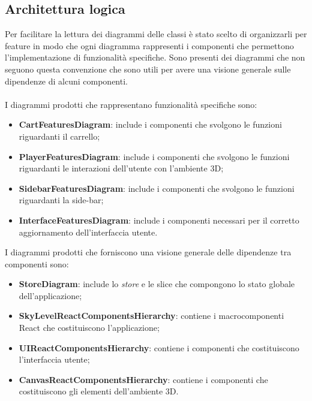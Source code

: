\subsection{Architettura logica}
Per facilitare la lettura dei diagrammi delle classi è stato scelto di organizzarli per feature in modo che ogni diagramma 
rappresenti i componenti che permettono l'implementazione di funzionalità specifiche.
Sono presenti dei diagrammi che non seguono questa convenzione che sono utili per avere una visione generale sulle dipendenze
di alcuni componenti.
\\\\
I diagrammi prodotti che rappresentano funzionalità specifiche sono:
\begin{itemize}
	\item \textbf{CartFeaturesDiagram}: include i componenti che svolgono le funzioni riguardanti il carrello;
	\item \textbf{PlayerFeaturesDiagram}: include i componenti che svolgono le funzioni riguardanti le interazioni dell'utente con 
	l'ambiente 3D;
	\item \textbf{SidebarFeaturesDiagram}: include i componenti che svolgono le funzioni riguardanti la side-bar;
	\item \textbf{InterfaceFeaturesDiagram}: include i componenti necessari per il corretto aggiornamento dell'interfaccia utente.
\end{itemize}
I diagrammi prodotti che forniscono una visione generale delle dipendenze tra componenti sono:
\begin{itemize}
	\item \textbf{StoreDiagram}: include lo \textit{store} e le slice che compongono lo stato globale dell'applicazione;
	\item \textbf{SkyLevelReactComponentsHierarchy}: contiene i macrocomponenti React che costituiscono l'applicazione;
	\item \textbf{UIReactComponentsHierarchy}: contiene i componenti che costituiscono l'interfaccia utente;
	\item \textbf{CanvasReactComponentsHierarchy}: contiene i componenti che costituiscono gli elementi dell'ambiente 3D.
\end{itemize}
